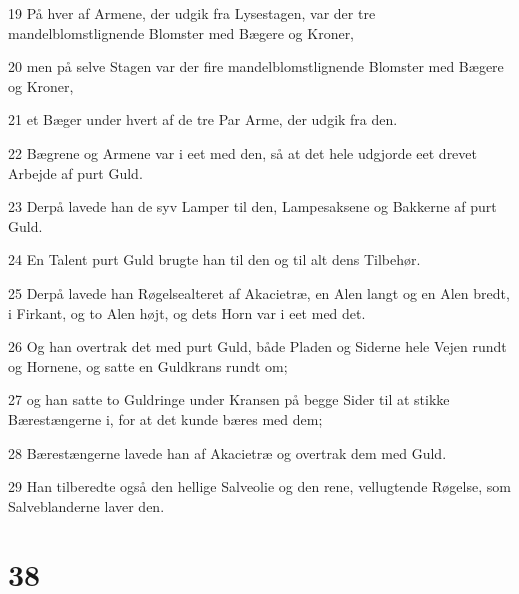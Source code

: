 \par 19 På hver af Armene, der udgik fra Lysestagen, var der tre mandelblomstlignende Blomster med Bægere og Kroner,
\par 20 men på selve Stagen var der fire mandelblomstlignende Blomster med Bægere og Kroner,
\par 21 et Bæger under hvert af de tre Par Arme, der udgik fra den.
\par 22 Bægrene og Armene var i eet med den, så at det hele udgjorde eet drevet Arbejde af purt Guld.
\par 23 Derpå lavede han de syv Lamper til den, Lampesaksene og Bakkerne af purt Guld.
\par 24 En Talent purt Guld brugte han til den og til alt dens Tilbehør.
\par 25 Derpå lavede han Røgelsealteret af Akacietræ, en Alen langt og en Alen bredt, i Firkant, og to Alen højt, og dets Horn var i eet med det.
\par 26 Og han overtrak det med purt Guld, både Pladen og Siderne hele Vejen rundt og Hornene, og satte en Guldkrans rundt om;
\par 27 og han satte to Guldringe under Kransen på begge Sider til at stikke Bærestængerne i, for at det kunde bæres med dem;
\par 28 Bærestængerne lavede han af Akacietræ og overtrak dem med Guld.
\par 29 Han tilberedte også den hellige Salveolie og den rene, vellugtende Røgelse, som Salveblanderne laver den.

\chapter{38}

